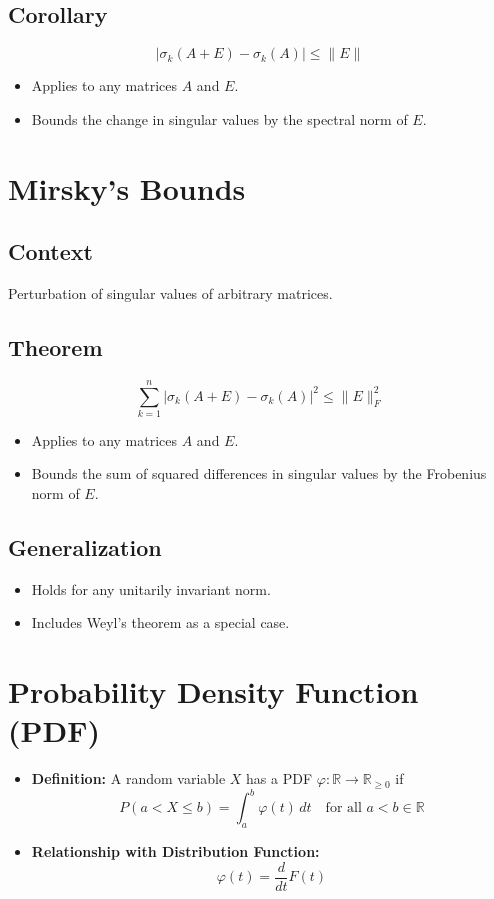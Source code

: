 \documentclass{article}
\begin{document}
\subsection{Corollary}
\[
\lvert \sigma_k(A + E) - \sigma_k(A) \rvert \leq \lVert E \rVert
\]
\begin{itemize}
    \item Applies to any matrices $A$ and $E$.
    \item Bounds the change in singular values by the spectral norm of $E$.
\end{itemize}

\section{Mirsky's Bounds}

\subsection{Context}
Perturbation of singular values of arbitrary matrices.

\subsection{Theorem}
\[
\sum_{k=1}^{n} \lvert \sigma_k(A + E) - \sigma_k(A) \rvert^2 \leq \lVert E \rVert_F^2
\]
\begin{itemize}
    \item Applies to any matrices $A$ and $E$.
    \item Bounds the sum of squared differences in singular values by the Frobenius norm of $E$.
\end{itemize}

\subsection{Generalization}
\begin{itemize}
    \item Holds for any unitarily invariant norm.
    \item Includes Weyl's theorem as a special case.
\end{itemize}











\section*{Probability Density Function (PDF)}
\begin{itemize}
    \item \textbf{Definition:} A random variable $X$ has a PDF $\varphi : \mathbb{R} \to \mathbb{R}_{\geq 0}$ if 
    \[
    P(a < X \leq b) = \int_a^b \varphi(t) \, dt \quad \text{for all } a < b \in \mathbb{R}
    \]
    
    \item \textbf{Relationship with Distribution Function:}
    \[
    \varphi(t) = \frac{d}{dt} F(t)
    \]
\end{itemize}
\end{document}

